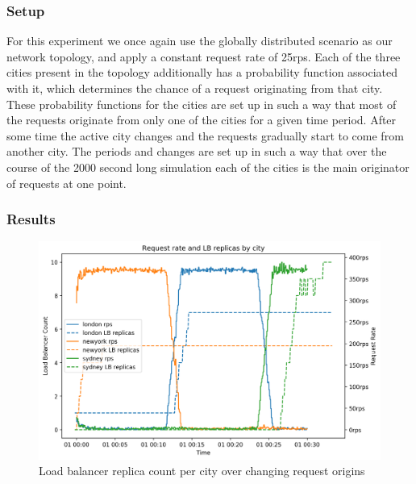 \documentclass[draft,final]{vutinfth} %
\begin{document}
\subsubsection{Setup}
For this experiment we once again use the globally distributed scenario as our network topology, and apply a constant request rate of 25\gls{rps}.
Each of the three cities present in the topology additionally has a probability function associated with it, which determines the chance of a request originating from that city.
These probability functions for the cities are set up in such a way that most of the requests originate from only one of the cities for a given time period.
After some time the active city changes and the requests gradually start to come from another city.
The periods and changes are set up in such a way that over the course of the 2000 second long simulation each of the cities is the main originator of requests at one point.

\subsubsection{Results}

\begin{figure}
    \centering
    \includegraphics[width=14cm]{graphics/graphs/osmotic_dynamic_region_rps_lb_relicas.png}
    \caption{Load balancer replica count per city over changing request origins}
    \label{fig:osmotic_dynamic_lb_replicas}
\end{figure}
\end{document}
